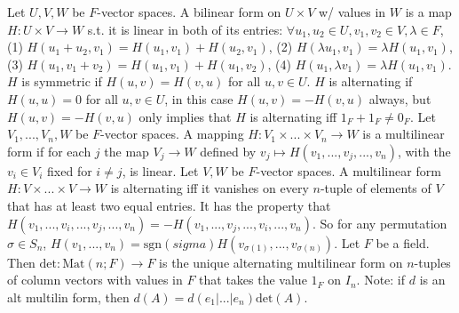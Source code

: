 Let $U, V, W$ be $F$-vector spaces.
A bilinear form on $U \times V$ w/ values in $W$ is a map $H : U \times V \to W$ s.t.
it is linear in both of its entries:
$\forall u_1, u_2 \in U, v_1, v_2 \in V, \lambda \in F$,
(1) $H(u_1 + u_2, v_1) = H(u_1, v_1) + H(u_2, v_1)$,
(2) $H(\lambda u_1, v_1) = \lambda H(u_1, v_1)$,
(3) $H(u_1, v_1 + v_2) = H(u_1, v_1) + H(u_1, v_2)$,
(4) $H(u_1, \lambda v_1) = \lambda H(u_1, v_1)$.
$H$ is symmetric if $H(u, v) = H(v, u)$ for all $u, v \in U$.
$H$ is alternating if $H(u,u) = 0$ for all $u, v \in U$,
in this case $H(u, v) = -H(v, u)$ always,
but $H(u, v) = -H(v, u)$ only implies that $H$ is alternating iff $1_F + 1_F \neq 0_F$.
Let $V_1, ..., V_n, W$ be $F$-vector spaces.
A mapping $H: V_1 \times ... \times V_n \to W$ is a multilinear form if
for each $j$ the map $V_j \to W$
defined by $v_j \mapsto H(v_1, ..., v_j, ..., v_n)$,
with the $v_i \in V_i$ fixed for $i \neq j$, is linear.
 Let $V, W$ be $F$-vector spaces.
A multilinear form $H : V \times ... \times V \to W$ is alternating iff
it vanishes on every $n$-tuple of elements of $V$ that has at least two equal entries.
It has the property that $H(v_1, ..., v_i, ..., v_j, ..., v_n) = -H(v_1, ..., v_j, ..., v_i, ..., v_n)$.
So for any permutation $\sigma \in S_n$,
$H(v_1, ..., v_n) = \text{sgn}(sigma) H(v_{\sigma(1)}, ..., v_{\sigma(n)})$.
Let $F$ be a field.
Then $\text{det} : \text{Mat}(n; F) \to F$ is the unique alternating multilinear form
on $n$-tuples of column vectors with values in $F$
that takes the value $1_F$ on $I_n$.
Note: if $d$ is an alt multilin form, then $d(A) = d(e_1|...|e_n)\text{det}(A)$.